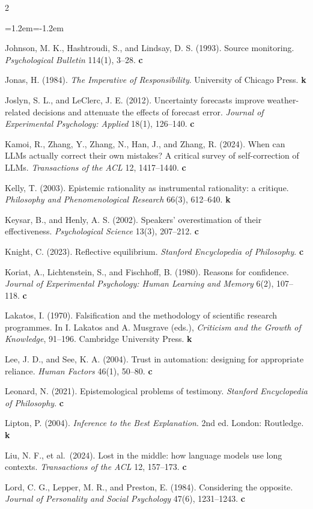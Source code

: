 \documentclass[11pt,a4paper]{article}
\begin{document}
\begin{multicols}{2}
\begin{list}{}{\leftmargin=1.2em\itemindent=-1.2em\itemsep=1pt}
\item Johnson, M. K., Hashtroudi, S., and Lindsay, D. S. (1993). Source monitoring. \textit{Psychological Bulletin} 114(1), 3--28. \textbf{c}
\item Jonas, H. (1984). \textit{The Imperative of Responsibility}. University of Chicago Press. \textbf{k}
\item Joslyn, S. L., and LeClerc, J. E. (2012). Uncertainty forecasts improve weather-related decisions and attenuate the effects of forecast error. \textit{Journal of Experimental Psychology: Applied} 18(1), 126--140. \textbf{c}
\item Kamoi, R., Zhang, Y., Zhang, N., Han, J., and Zhang, R. (2024). When can LLMs actually correct their own mistakes? A critical survey of self-correction of LLMs. \textit{Transactions of the ACL} 12, 1417--1440. \textbf{c}
\item Kelly, T. (2003). Epistemic rationality as instrumental rationality: a critique. \textit{Philosophy and Phenomenological Research} 66(3), 612--640. \textbf{k}
\item Keysar, B., and Henly, A. S. (2002). Speakers' overestimation of their effectiveness. \textit{Psychological Science} 13(3), 207--212. \textbf{c}
\item Knight, C. (2023). Reflective equilibrium. \textit{Stanford Encyclopedia of Philosophy}. \textbf{c}
\item Koriat, A., Lichtenstein, S., and Fischhoff, B. (1980). Reasons for confidence. \textit{Journal of Experimental Psychology: Human Learning and Memory} 6(2), 107--118. \textbf{c}
\item Lakatos, I. (1970). Falsification and the methodology of scientific research programmes. In I. Lakatos and A. Musgrave (eds.), \textit{Criticism and the Growth of Knowledge}, 91--196. Cambridge University Press. \textbf{k}
\item Lee, J. D., and See, K. A. (2004). Trust in automation: designing for appropriate reliance. \textit{Human Factors} 46(1), 50--80. \textbf{c}
\item Leonard, N. (2021). Epistemological problems of testimony. \textit{Stanford Encyclopedia of Philosophy}. \textbf{c}
\item Lipton, P. (2004). \textit{Inference to the Best Explanation}. 2nd ed. London: Routledge. \textbf{k}
\item Liu, N. F., et al.\ (2024). Lost in the middle: how language models use long contexts. \textit{Transactions of the ACL} 12, 157--173. \textbf{c}
\item Lord, C. G., Lepper, M. R., and Preston, E. (1984). Considering the opposite. \textit{Journal of Personality and Social Psychology} 47(6), 1231--1243. \textbf{c}

\end{list}
\end{multicols}
\end{document}

